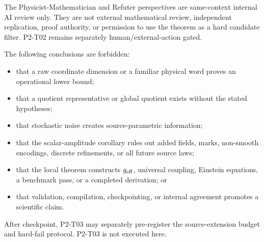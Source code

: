 \documentclass[11pt]{article}
\begin{document}
The Physicist-Mathematician and Refuter perspectives are same-context internal
AI review only.  They are not external mathematical review, independent
replication, proof authority, or permission to use the theorem as a hard
candidate filter.  P2-T02 remains separately human/external-action gated.

The following conclusions are forbidden:
\begin{itemize}
  \item that a raw coordinate dimension or a familiar physical word proves an
        operational lower bound;
  \item that a quotient representative or global quotient exists without the
        stated hypotheses;
  \item that stochastic noise creates source-parametric information;
  \item that the scalar-amplitude corollary rules out added fields, marks,
        non-smooth encodings, discrete refinements, or all future source laws;
  \item that the local theorem constructs \(g_{\rm eff}\), universal coupling,
        Einstein equations, a benchmark pass, or a completed derivation; or
  \item that validation, compilation, checkpointing, or internal agreement
        promotes a scientific claim.
\end{itemize}

After checkpoint, P2-T03 may separately pre-register the source-extension
budget and hard-fail protocol.  P2-T03 is not executed here.
\end{document}
